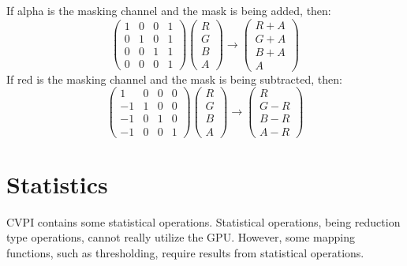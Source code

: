 \documentclass[12pt]{report}
\begin{document}
If alpha is the masking channel and the mask is being added, then:
\[
\begin{pmatrix} 1 & 0 & 0 & 1 \\ 0 & 1 & 0 & 1 \\ 0 & 0 & 1 & 1 \\ 0 & 0 & 0 & 1 \end{pmatrix}
  \begin{pmatrix} R \\ G \\ B \\ A \end{pmatrix} \to \begin{pmatrix} R + A \\ G + A \\ B + A \\ A \end{pmatrix}
\]
   If red is the masking channel and the mask is being subtracted, then:
   \[\begin{pmatrix} 1 & 0 & 0 & 0 \\ -1 & 1 & 0 & 0 \\ -1 & 0 & 1 & 0 \\ -1 & 0 & 0 & 1 \end{pmatrix}\begin{pmatrix} R \\ G \\ B \\ A \end{pmatrix} \to \begin{pmatrix} R \\ G - R \\ B - R \\ A - R \end{pmatrix}
\]

\section{Statistics}
\label{sec-3-11}
CVPI contains some statistical operations. Statistical operations,
being reduction type operations, cannot really utilize the
GPU. However, some mapping functions, such as thresholding, require
results from statistical operations.
\end{document}
